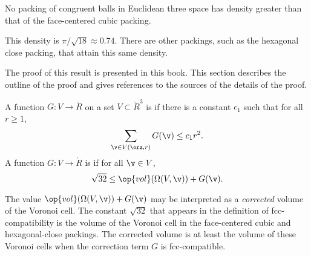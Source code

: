 \begin{theorem}
\label{theorem:kepler}   No packing of congruent balls in
Euclidean three space has density greater than that of the
face-centered cubic packing.
\end{theorem}

\begin{remark}
This density is $\pi/\sqrt{18}\approx 0.74.$  There are other
packings, such as the hexagonal close packing, that attain this
same density.
\end{remark}

The proof of this result is presented in this book. This section
describes the outline of the proof and gives references to
the sources of the details of the proof.



\begin{definition}\label{def:negligible}
A function $G:V\to \ring{R}$ on a set $V\subset\ring{R}^3$
is 
if there is a constant $c_1$ such that for all $r\ge1$,
\begin{displaymath}\sum_{\v\in V(\orz,r)} G(\v) \le c_1
r^2.\end{displaymath}
A function $G: V\to\ring{R}$ is
if for all $\v\in V$, 
\begin{displaymath}\sqrt{32}\le \op{vol}(\Omega(V,\v)) +
G(\v).\end{displaymath}
%
%
%
\end{definition}


\begin{remark}
The value $\op{vol}(\Omega(V,\v)) + G(\v)$ may be interpreted as a
{\it corrected\/} volume of the Voronoi cell. The constant
$\sqrt{32}$ that appears in the definition of fcc-compatibility is
the volume of the Voronoi cell in the face-centered cubic and
hexagonal-close packings.  The corrected volume is at least the
volume of these Voronoi cells when the correction term $G$ is
fcc-compatible.  %
\end{remark}




